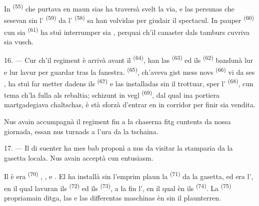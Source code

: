 \VUsaut{3.0mm}

In  \textsuperscript{(55)} che purtava en maun sias
 ha traversà svelt la via, e las persunas che sesevan sin
l' \textsuperscript{(59)} da l' \textsuperscript{(58)} sa
han
volvidas per giudair il spectacul. In pauper 
\textsuperscript{(60)} cun sia  \textsuperscript{(61)} ha stuì interrumper
sia , perquai ch'il canaster dals tamburs cuvriva sia vusch.

16. --- Cur ch'il regiment è arrivà avant il 
\textsuperscript{(64)}, han las  \textsuperscript{(63)} ed ils 
\textsuperscript{(62)} bandunà lur  e lur lavur per guardar tras
la fanestra.  \textsuperscript{(65)}, ch'aveva gist mess novs
 \textsuperscript{(66)} vi da ses , ha stuì far metter dadens
ils  \textsuperscript{(67)} e las  installadas sin il trottuar,
sper l' \textsuperscript{(68)}, cun tema ch'la fulla als
rebaltia; schizunt in vegl  \textsuperscript{(69)}, dal qual ina portiera
martgadegiava chaltschas, è stà sforzà d'entrar en in corridor per finir sia vendita.

Nus avain accumpagnà il regiment fin a la chaserna  fitg cuntents da nossa
giornada, essan nus turnads a l'ura da la tschaina.

\VUsaut{3.0mm}

17. --- Il di suenter ha mes bab proponì a nus da visitar la stamparia da la gasetta
locala. Nus avain acceptà cun entusiasm.

Il  è era  \textsuperscript{(70)} , ,  e .
El ha installà sin l'emprim plaun la  \textsuperscript{(71)} da la gasetta,
ed era l', en il qual lavuran ils 
\textsuperscript{(72)} ed ils  \textsuperscript{(73)}, a la fin
l', en il qual èn ils 
\textsuperscript{(74)}. La  \textsuperscript{(75)} propriamain ditga, las
 e las differentas maschinas èn sin il plaunterren.

